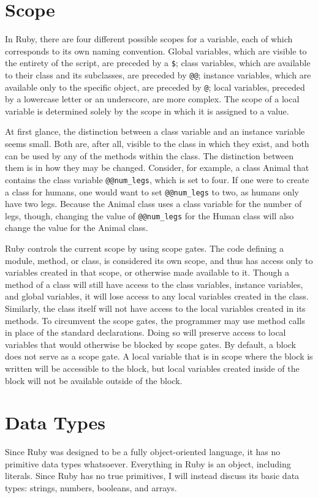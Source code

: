 \documentclass[12pt]{article}
\begin{document}
\section{Scope}
In Ruby, there are four different possible scopes for a variable, each of which corresponds to its own naming convention. Global variables, which are visible to the entirety of the script, are preceded by a \verb|$|; class variables, which are available to their class and its subclasses, are preceded by \verb|@@|; instance variables, which are available only to the specific object, are preceded by \verb|@|; local variables, preceded by a lowercase letter or an underscore, are more complex. The scope of a local variable is determined solely by the scope in which it is assigned to a value\cite{darko}.

At first glance, the distinction between a class variable and an instance variable seems small. Both are, after all, visible to the class in which they exist, and both can be used by any of the methods within the class. The distinction between them is in how they may be changed. Consider, for example, a class Animal that contains the class variable \verb|@@num_legs|, which is set to four. If one were to create a class for humans, one would want to set \verb|@@num_legs| to two, as humans only have two legs. Because the Animal class uses a class variable for the number of legs, though, changing the value of \verb|@@num_legs| for the Human class will also change the value for the Animal class\cite{darko}.

Ruby controls the current scope by using scope gates. The code defining a module, method, or class, is considered its own scope, and thus has access only to variables created in that scope, or otherwise made available to it. Though a method of a class will still have access to the class variables, instance variables, and global variables, it will lose access to any local variables created in the class. Similarly, the class itself will not have access to the local variables created in its methods. To circumvent the scope gates, the programmer may use method calls in place of the standard declarations. Doing so will preserve access to local variables that would otherwise be blocked by scope gates. By default, a block does not serve as a scope gate. A local variable that is in scope where the block is written will be accessible to the block, but local variables created inside of the block will not be available outside of the block\cite{darko}. 


\section{Data Types}
Since Ruby was designed to be a fully object-oriented language, it has no primitive data types whatsoever. Everything in Ruby is an object, including literals. Since Ruby has no true primitives, I will instead discuss its basic data types: strings, numbers, booleans, and arrays.
\end{document}
